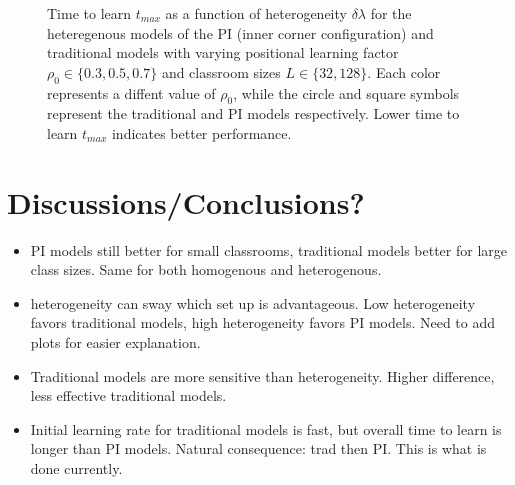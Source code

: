\begin{figure}[htbp!]
   \centering
   \caption{Time to learn $t_{max}$ as a function of heterogeneity $\delta\lambda$ for the heteregenous models of the PI (inner corner configuration) and traditional models with varying positional learning factor $\rho_0\in\lbrace 0.3,0.5,0.7 \rbrace$ and classroom sizes $L\in\lbrace32,128\rbrace$. 
   Each color represents a diffent value of $\rho_0$, while the circle and square symbols represent the traditional and PI models respectively.
   Lower time to learn $t_{max}$ indicates better performance.
   }
   \label{fig:2DBPCAIH dl-t plots}
\end{figure}

\section{Discussions/Conclusions?}\label{sec:BPCAIH discussions}
\begin{itemize}
   \item PI models still better for small classrooms, traditional models better for large class sizes. Same for both homogenous and heterogenous.
   \item heterogeneity can sway which set up is advantageous. Low heterogeneity favors traditional models, high heterogeneity favors PI models. Need to add plots for easier explanation.
   \item Traditional models are more sensitive than heterogeneity. Higher difference, less effective traditional models.
   \item Initial learning rate for traditional models is fast, but overall time to learn is longer than PI models. Natural consequence: trad then PI. This is what is done currently.
\end{itemize}
